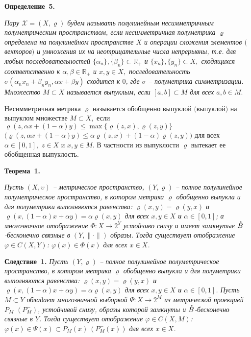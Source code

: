 \textbf{Определение~5.} {\it
 Пару $\mathcal{X}=(X,\varrho)$ будем называть полулинейным несимметричным полуметрическим пространством, если несимметричная полуметрика $\varrho$  определена на полулинейном пространстве $X$ и операции сложения элементов $($векторов$)$ и умножения их на неотрицательные числа непрерывны, т.е. для любых последовательностей $\{\alpha_n\},\{\beta_n\}\subset \mathbb{R}_+$ и $\{x_n\},\{y_n\}\subset X,$ сходящихся соответственно к $\alpha,\beta\in \mathbb{R}_+$ и $x,y\in X,$ последовательность  $\sigma(\alpha_n x_n+\beta_n y_n,\alpha x +\beta  y ) $ сходится к $0$, где $\sigma$ -- полуметрика симметризации.
Множество $M\subset X$ называется выпуклым, если $[a,b]\subset M$ для всех $a,b\in M.$

Несимметричная метрика $\varrho$ называется обобщенно выпуклой $($выпуклой$)$ на выпуклом множестве $M\subset X,$ если $\varrho(z,\alpha x+(1-\alpha)y)\leqslant  \max\{\varrho(z,x),\varrho(z,y)\}$ $\big(\varrho(z,\alpha x+(1-\alpha)y)\leqslant \alpha\varrho(z,x)+(1-\alpha)\varrho(z,y)\big)$ для всех $\alpha\in[0,1],$ $z\in X$ и $x,y \in M.$ В частности из выпуклости $\varrho$ вытекает ее обобщенная выпуклость.}


\textbf{Теорема~1.} {\it    Пусть  $(X,\upsilon)$ --
 метрическое пространство,
$(Y,\varrho)$  -- полное полулинейное
полуметрическое пространство, в котором метрика $\varrho$ обобщенно выпукла и для полуметрики выполняются равенства: $\varrho(x,y )=\varrho(y,x)$ и
$\varrho(x,(1-\alpha)x+\alpha y )= \alpha \varrho(x,y) $ для всех $x,y\in X$ и $\alpha\in [0,1]$;
а многозначное отображение $\Phi:X\rightarrow 2^Y$  устойчиво
снизу  и имеет замкнутые $\mathaccent'27{B} $-бесконечно связные в $ (Y,\|\cdot\|) $ образы.
 Тогда существует отображение $\varphi\in C(X,  Y)$:
$\varphi(x)\in \Phi(x)$ для всех $x\in  X$.

}





\textbf{Следствие~1.} {\it   Пусть
 $(Y,\varrho)$  -- полное полулинейное
полуметрическое пространство, в котором метрика $\varrho$ обобщенно выпукла и для полуметрики выполняются равенства: $\varrho(x,y )=\varrho(y,x)$ и
$\varrho(x,(1-\alpha)x+\alpha y )= \alpha \varrho(x,y) $ для всех $x,y\in X$ и $\alpha\in [0,1]$. Пусть $M\subset Y$ обладает
многозначной выборкой $\Psi:X\rightarrow 2^M$ из метрической проекцией $P_M$ $(P_M^-)$,
 устойчивой
снизу, образы которой замкнуты и $\mathaccent'27{B} $-бесконечно связные в $Y$.
 Тогда существует отображение $\varphi\in C(X,  M)$:
$\varphi(x)\in \Psi(x)\subset P_M(x)\ (P_M^-(x))$ для всех $x\in  X$.
}



